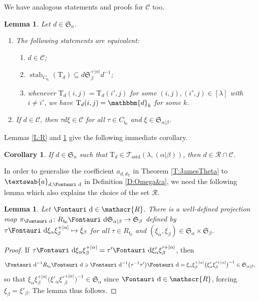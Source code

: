 \documentclass[pdftex]{sigma}
\newtheorem{Corollary}[Theorem]{Corollary}
\newtheorem{Lemma}[Theorem]{Lemma}
\renewcommand{\t}{\mathfrak{t}}
\renewcommand{\a}{\textswab{a}}
\newcommand{\TTS}{\mathscr{T}_\mathrm{sstd}}
\newcommand{\T}{\mathrm{T}}
\newcommand{\stab}{\operatorname{stab}}
\newcommand{\sym}[1]{\mathfrak{S}_{#1}}
\newcommand{\bb}[1]{\mathbbm{{#1}}}
\newcommand{\R}{\mathscr{R}}
\newcommand{\C}{\mathscr{C}}
\newcommand{\dR}{\text{\Fontauri d}}
\newcommand{\tlsym}[2]{\mathfrak{S}_{#1}^{+#2}}
\newcommand{\tlxi}[2]{\xi_{#1}^{+#2}}
\begin{document}
We have analogous statements and proofs for $\C$ too.

\begin{Lemma} \label{L:C}
Let $d \in \sym{n}$.
\begin{enumerate}\itemsep=0pt
\item[$(i)$] The following statements are equivalent:
\begin{enumerate}\itemsep=0pt
\item [$(a)$] $d \in \C$;
\item [$(b)$] $\stab_{C_{\t_0}} (\T_d) \subseteq d\tlsym{\beta}{|\alpha|}d^{-1}$;
\item [$(c)$] whenever $\T_d(i,j) = \T_d(i',j)$ for some $(i,j),(i',j) \in [\lambda]$ with $i \ne i'$, we have $\T_d(i,j) = \bb{d}_k$ for some $k$.
\end{enumerate}
\item[$(ii)$] If $d \in \C$, then $\tau d \xi \in \C$ for all $\tau \in C_{\t_0}$ and $\xi \in \sym{\alpha|\beta}$.
\end{enumerate}
\end{Lemma}

Lemmas \ref{L:R} and \ref{L:C} give the following immediate corollary.

\begin{Corollary}\label{C:sstdRC}
If $d \in \sym{n}$ such that $\T_d \in \TTS(\lambda, (\alpha|\beta))$, then $d \in \R \cap \C$.
\end{Corollary}

In order to generalise the coefficient $a_{d,d_\T}$ in Theorem \ref{T:JamesTheta} to $\a_{d,\dR}$ in Definition \ref{D:Omega&a}, we need the following lemma which also explains the choice of the set $\R$.

\begin{Lemma} \label{L:projection}
Let $\dR \in \R$. There is a well-defined projection map $\pi_\dR\colon R_{\t_0}\dR\sym{\alpha|\beta} \to \sym{\beta}$ defined by $\tau \dR \xi_{\alpha} \tlxi{\beta}{|\alpha|} \mapsto \xi_{\beta}$ for all $\tau \in R_{\t_0}$ and $(\xi_\alpha,\xi_\beta) \in \sym{\alpha} \times \sym{\beta}$.
\end{Lemma}

\begin{proof}If $\tau \dR \xi_{\alpha}\tlxi{\beta}{|\alpha|} = \tau' \dR \xi'_{\alpha} \xi'^{+|\alpha|}_{\beta}$, then
\begin{gather*}\dR^{-1} R_{\t_0} \dR \ni \dR^{-1} \big(\tau^{-1} \tau'\big)\dR = \xi_{\alpha}\tlxi{\beta}{|\alpha|} \big(\xi'_{\alpha} \xi'^{+|\alpha|}_{\beta}\big)^{-1} \in \sym{\alpha|\beta},\end{gather*}
so that $\xi_{\alpha}\tlxi{\beta}{|\alpha|} \big(\xi'_{\alpha} \xi'^{+|\alpha|}_{\beta}\big)^{-1} \in \sym{\alpha}$ since $\dR \in \R$, forcing $\xi_{\beta} = \xi'_{\beta}$. The lemma thus follows.
\end{proof}
\end{document}
